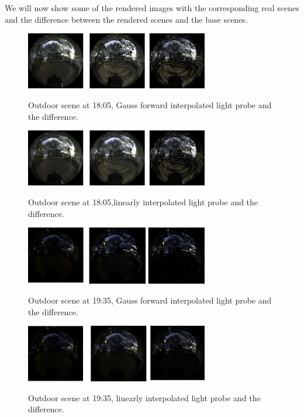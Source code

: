 \documentclass[conference]{acmsiggraph}
\begin{document}
	We will now show some of the rendered images with the corresponding real scenes and the difference between the rendered scenes and the base scenes.

	\begin{figure}[!ht]
		\caption{Outdoor scene at 18:05, Gauss forward interpolated light probe and the difference.}
		\centering
		\includegraphics[width=8cm]{images/ext1forward.png}
		\label{fig:ext1forward}
	\end{figure}

	\begin{figure}[!ht]
		\caption{Outdoor scene at 18:05,linearly interpolated light probe and the difference.}
		\centering
		\includegraphics[width=8cm]{images/ext1linear.png}
		\label{fig:ext1linear}
	\end{figure}

	\begin{figure}[!ht]
		\caption{Outdoor scene at 19:35, Gauss forward interpolated light probe and the difference.}
		\centering
		\includegraphics[width=8cm]{images/ext3forward.png}
		\label{fig:ext3forward}
	\end{figure}

	\begin{figure}[!ht]
		\caption{Outdoor scene at 19:35,  linearly interpolated light probe and the difference.}
		\centering
		\includegraphics[width=8cm]{images/ext3linear.png}
		\label{fig:ext3linear}
	\end{figure}
\end{document}
